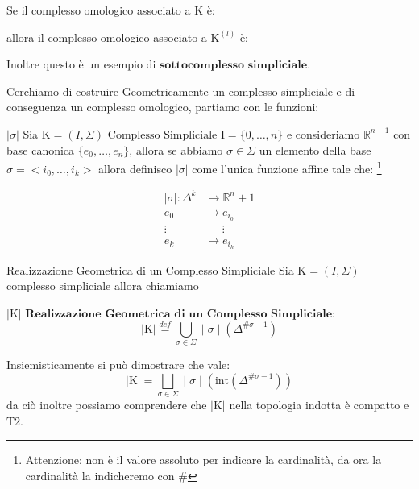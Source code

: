 \documentclass[11pt, a4paper, twoside]{article}
\begin{document}
\begin{oss}
	Se il complesso omologico associato a K è:
	\begin{center}
	\end{center}
	allora il complesso omologico associato a $\text{K}^{(l)}$ è:
	\begin{center}
	\end{center}
	Inoltre questo è un esempio di $\textbf{sottocomplesso simpliciale}$.
\end{oss}
Cerchiamo di costruire Geometricamente un complesso simpliciale e di conseguenza un complesso omologico, partiamo con le funzioni:
\begin{defn}{$|\sigma|$}{}
	Sia $\text{K}=(I,\Sigma)\text{ Complesso Simpliciale } \text{I}=\{0,\dots,n\}$ e consideriamo $\mathbb{R}^{n+1}$ con base canonica $\{e_0,\dots,e_n\}$, allora se abbiamo $\sigma\in\Sigma$ un elemento della base $\sigma=<i_0,\dots,i_k>$ allora definisco $|\sigma|$ come l'unica funzione affine tale che: \footnote{ Attenzione: non è il valore assoluto per indicare la cardinalità, da ora la cardinalità la indicheremo con $\#$}
	\begin{center}
		\begin{align*}
			\mid\sigma\mid:\Delta^k&\rightarrow\mathbb{R}^n+1\\
			e_0&\mapsto e_{i_0}\\
			\vdots&\quad\,\,\,\vdots\\
			e_k&\mapsto e_{i_k}
		\end{align*}
	\end{center}
\end{defn}

\begin{defn}{Realizzazione Geometrica di un Complesso Simpliciale}{}
	Sia $\text{K}=(I,\Sigma)$ complesso simpliciale allora chiamiamo 
	
$|\text{K}|\,\,\textbf{Realizzazione Geometrica di un Complesso Simpliciale}$:
	\[
		|\text{K}|\stackrel{def}=\bigcup\limits_{\sigma\in\Sigma} \mid\sigma\mid(\Delta^{\#\sigma-1})
	\]
	
\end{defn}
\newpage
\begin{oss}
	Insiemisticamente si può dimostrare che vale:
	\[
		|\text{K}|=\bigsqcup\limits_{\sigma\in\Sigma}\mid\sigma\mid(\text{int}(\Delta^{\#\sigma-1}))
	\]
	da ciò inoltre possiamo comprendere che $|\text{K}|$ nella topologia indotta è compatto e $\text{T}2$.
\end{oss}
\end{document}
